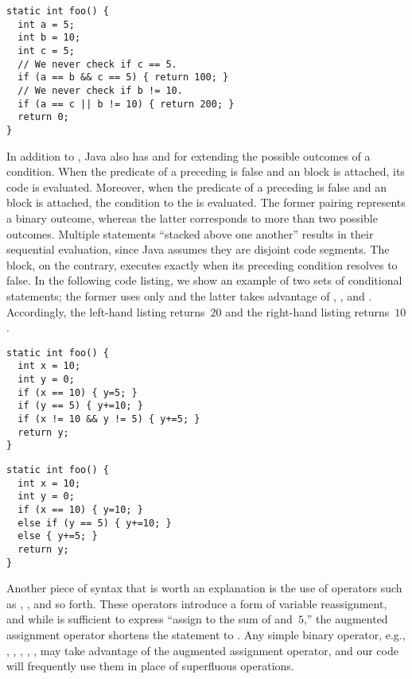 \begin{lstlisting}[language=MyJava]
static int foo() {
  int a = 5;
  int b = 10;
  int c = 5;
  // We never check if c == 5.
  if (a == b && c == 5) { return 100; }
  // We never check if b != 10.
  if (a == c || b != 10) { return 200; }
  return 0;
}
\end{lstlisting}

In addition to , Java also has  and  for extending the possible outcomes of a condition. 
When the predicate of a preceding  is false and an  block is attached, its code is evaluated. 
Moreover, when the predicate of a preceding  is false and an  block is attached, the condition to the  is evaluated. 
The former pairing represents a binary outcome, whereas the latter corresponds to more than two possible outcomes. 
Multiple  statements ``stacked above one another'' results in their sequential evaluation, since Java assumes they are disjoint code segments. 
The  block, on the contrary, executes exactly when its preceding  condition resolves to false. 
In the following code listing, we show an example of two sets of conditional statements; the former uses only  and the latter takes advantage of , , and . 
Accordingly, the left-hand listing returns~$20$ and the right-hand listing returns~$10$.

\begin{clrr}[]{}
\begin{lstlisting}[language=MyJava]
static int foo() {
  int x = 10;
  int y = 0;
  if (x == 10) { y=5; } 
  if (y == 5) { y+=10; }
  if (x != 10 && y != 5) { y+=5; }
  return y;
}
\end{lstlisting}
\tcblower
\begin{lstlisting}[language=MyJava]
static int foo() {
  int x = 10;
  int y = 0;
  if (x == 10) { y=10; } 
  else if (y == 5) { y+=10; } 
  else { y+=5; }
  return y;
}
\end{lstlisting}
\end{clrr}

Another piece of syntax that is worth an explanation is the use of operators such as \ttt{+=}, \ttt{*=}, and so forth. 
These operators introduce a form of variable reassignment, and while  is sufficient to express ``assign to  the sum of  and~$5$,'' the augmented assignment operator shortens the statement to . 
Any simple binary operator, e.g., \ttt{+}, \ttt{-}, \ttt{*}, \ttt{/}, \ttt{\%}, may take advantage of the augmented assignment operator, and our code will frequently use them in place of superfluous operations.

